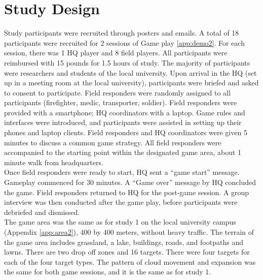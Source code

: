 \section{Study Design}
Study participants were recruited through posters and emails. A total of 18 participants were recruited for 2 sessions of Game play \ref{app:demo2}. For each session, there was 1 HQ player and 8 field players. All participants were reimbursed with 15 pounds for 1.5 hours of study. The majority of participants were researchers and students of the local university.  Upon arrival in the HQ (set up in a meeting room at the local university), participants were briefed and asked to consent to participate. Field responders were randomly assigned to all participants (firefighter, medic, transporter, soldier). Field responders were provided with a smartphone; HQ coordinators with a laptop. Game rules and interfaces were introduced, and participants were assisted in setting up their phones and laptop clients. Field responders and HQ coordinators were given 5 minutes to discuss a common game strategy. All field responders were accompanied to the starting point within the designated game area, about 1 minute walk from headquarters.\\

Once field responders were ready to start, HQ sent a ``game start'' message. Gameplay commenced for 30 minutes. A ``Game over'' message by HQ concluded the game. Field responders returned to HQ for the post-game session. A group interview was then conducted after the game play, before participants were debriefed and dismissed.\\

The game area was the same as for study 1 on the local university campus (Appendix \ref{app:area2}), 400 by 400 meters, without heavy traffic. The terrain of the game area includes grassland, a lake, buildings, roads, and footpaths and lawns. There are two drop off zones and 16 targets. There were four targets for each of the four target types. The pattern of cloud movement and expansion was the same for both game sessions, and it is the same as for study 1.\\


